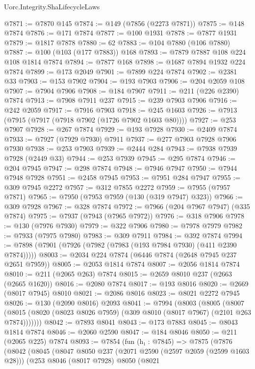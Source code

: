 \begin{lexlean}{Uorc.Integrity.ShaLifecycleLaws}
\begin{coremodule}
@7871 := @7870 @145
@7874 := @149 (@7856 (@2273 @7871))
@7875 := @148 @7874
@7876 := @171 @7874
@7877 := @100 @1931
@7878 := @7877 @1931
@7879 := @1817 @7878
@7880 := 62
@7883 := @104 @7880 (@106 @7880)
@7887 := @100 (@103 (@177 @7883)) @168
@7893 := @7879 @7887 @108 @224 @108 @1814 @7874
@7894 := @7877 @168
@7898 := @1687 @7894 @1932 @224 @7874
@7899 := @173 @2049
@7901 := @7899 @224 @7874
@7902 := @2381 @33
@7903 := @153 @7902
@7904 := @193 @7903
@7906 := @204 @2059 @108
@7907 := @7904 @7906
@7908 := @184 @7907
@7911 := @211 (@226 @2390) @7874
@7913 := @7908 @7911 @237
@7915 := @239 @7903 @7906
@7916 := @242 @2059
@7917 := @7916 @7903
@7918 := @245 @1603
@7926 := @7913 (@7915 (@7917 (@7918 @7902 (@1726 @7902 @1603 @80))))
@7927 := @253 @7907
@7928 := @267 @7874
@7929 := @193 @7928
@7930 := @2409 @7874
@7933 := @7927 (@7929 @7930) @7911
@7937 := @277 @7903 @7928 @7906 @7930
@7938 := @253 @7903
@7939 := @2444 @284
@7943 := @7938 @7939 @7928 (@2449 @33)
@7944 := @253 @7939
@7945 := @295 @7874
@7946 := @204 @7945
@7947 := @298 @7874
@7948 := @7946 @7947
@7950 := @7944 @7948 @7928
@7951 := @2458 @7945
@7953 := @7951 @284 @7947
@7955 := @309 @7945 @2272
@7957 := @312 @7855 @2272
@7959 := @7955 (@7957 @7871)
@7965 := @7950 (@7953 @7959 (@130 (@319 @7947) @323))
@7966 := @309 @7928
@7967 := @328 @7874
@7972 := @7966 (@204 @7967 @7947) (@335 @7874)
@7975 := @7937 (@7943 (@7965 @7972))
@7976 := @318 @7906
@7978 := @130 (@7976 @7930)
@7979 := @322 @7906
@7980 := @7978 @7979
@7982 := @7933 (@7975 @7980)
@7983 := @309 @7911
@7984 := @392 @7874
@7994 := @7898 (@7901 (@7926 (@7982 (@7983 (@193 @7984 @7930) (@411 @2390 @7874)))))
@8003 := @2034 @224 @7874 (@6446 @7874 (@2648 @7945 @237 @2651 @7959))
@8005 := @2053 @1814 @7874
@8007 := @2056 @1814 @7874
@8010 := @211 (@2065 @263) @7874
@8015 := @2659 @8010 @237 (@2663 (@2665 @1620))
@8016 := @2080 @7874
@8017 := @193 @8016
@8020 := @2669 (@8017 @7945) @8010
@8021 := @2086 @8016
@8023 := @8021 @2272 @7945
@8026 := @130 (@2090 @8016) @2093
@8041 := @7994
    (@8003
      (@8005
        (@8007 (@8015 (@8020 (@8023 @8026 @7959) (@309 @8010 (@8017 @7967) (@2101 @263 @7874)))))))
@8042 := @7893 @8041
@8043 := @173 @7883
@8045 := @8043 @1814 @7874
@8046 := @2060 @2590
@8047 := @184 @8046
@8050 := @211 (@2065 @225) @7874
@8093 := @7854
    (fun (h₁ : @7845) =>
    @7875
      (@7876
        (@8042
          (@8045
            (@8047
              @8050
              @237
              (@2071 @2590 (@2597 @2059 (@2599 @1603 @28)))
              (@253
                @8046
                (@8017 @7928)
                @8050
                (@8021

\end{coremodule}
\end{lexlean}
